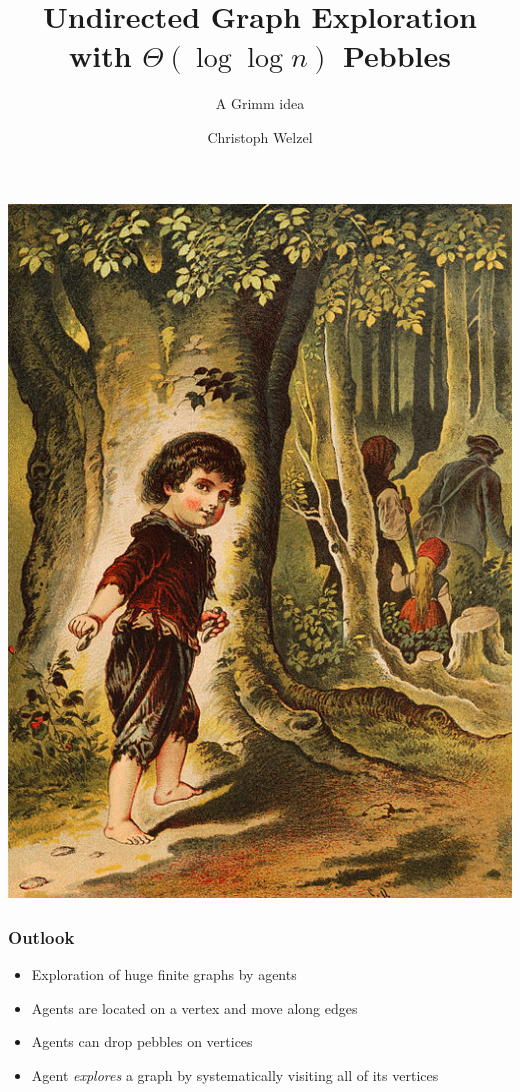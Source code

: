 \documentclass{beamer}
\title{Undirected Graph Exploration with $\Theta(\log\log n)$ Pebbles}
\subtitle{A Grimm idea}
\author{Christoph Welzel}
\institute{Logik und Theorie diskreter Systeme, RWTH Aachen}
\begin{document}
\maketitle
\begin{frame}
  \begin{center}
    \includegraphics{hanselgretel.jpg}
  \end{center}
\end{frame}

\begin{frame}
  \frametitle{Outlook}
  \begin{itemize}
    \item Exploration of huge finite graphs by agents
    \item Agents are located on a vertex and move along edges
    \item Agents can drop pebbles on vertices
    \item Agent \emph{explores} a graph by systematically visiting all of
      its vertices
  \end{itemize}
\end{frame}
\end{document}
